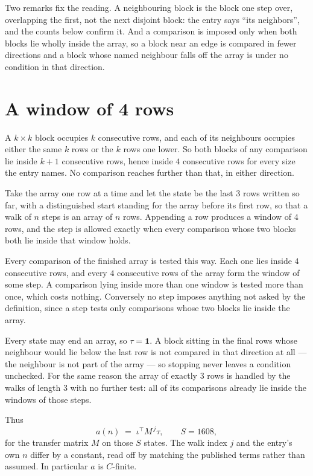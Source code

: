 \documentclass[11pt,a4paper]{article}
\theoremstyle{plain}
\theoremstyle{definition}
\begin{document}
Two remarks fix the reading. A neighbouring block is the block one step over, overlapping the
first, not the next disjoint block: the entry says ``its neighbors'', and the counts below
confirm it. And a comparison is imposed only when both blocks lie wholly inside the array, so a
block near an edge is compared in fewer directions and a block whose named neighbour falls off
the array is under no condition in that direction.

\section{A window of 4 rows}

A $k\times k$ block occupies $k$ consecutive rows, and each of its neighbours occupies either
the same $k$ rows or the $k$ rows one lower. So both blocks of any comparison lie inside $k+1$
consecutive rows, hence inside $4$ consecutive rows for every size the entry names. No
comparison reaches further than that, in either direction.

Take the array one row at a time and let the state be the last 3 rows written so far, with a
distinguished start standing for the array before its first row, so that a walk of $n$ steps is
an array of $n$ rows. Appending a row produces a window of $4$ rows, and the step is
allowed exactly when every comparison whose two blocks both lie inside that window holds.

Every comparison of the finished array is tested this way. Each one lies inside $4$
consecutive rows, and every $4$ consecutive rows of the array form the window of some
step. A comparison lying inside more than one window is tested more than once, which costs
nothing. Conversely no step imposes anything not asked by the definition, since a step tests
only comparisons whose two blocks lie inside the array.

Every state may end an array, so $\tau=\mathbf{1}$. A block sitting in the final rows whose
neighbour would lie below the last row is not compared in that direction at all --- the
neighbour is not part of the array --- so stopping never leaves a condition unchecked. For the
same reason the array of exactly $3$ rows is handled by the walks of length $3$ with no
further test: all of its comparisons already lie inside the windows of those steps.

Thus
\[
a(n)\;=\;\iota^{\!\top}M^{\,j}\tau ,\qquad S=1608,
\]
for the transfer matrix $M$ on those $S$ states. The walk index $j$ and the entry's own $n$
differ by a constant, read off by matching the published terms rather than assumed. In
particular $a$ is $C$-finite.
\end{document}
